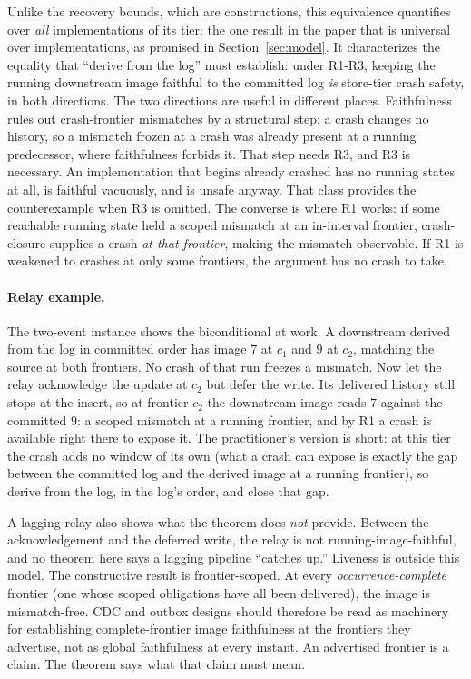 \documentclass[sigplan,10pt]{acmart}
\theoremstyle{plain}
\theoremstyle{definition}
\begin{document}
Unlike the recovery bounds, which are constructions, this equivalence
quantifies over \emph{all} implementations of its tier: the one
result in the paper that is universal over implementations, as promised in
Section~\ref{sec:model}. It characterizes the equality that ``derive
from the log'' must establish: under R1-R3, keeping the running
downstream image faithful to the committed log \emph{is} store-tier
crash safety, in both directions. The two directions are useful in
different places. Faithfulness rules out crash-frontier mismatches
by a structural step: a crash changes no history, so a mismatch frozen
at a crash was already present at a running predecessor, where
faithfulness forbids it. That step needs R3, and R3 is necessary. An
implementation that begins already crashed has no running states at
all, is faithful vacuously, and is unsafe anyway. That class provides
the counterexample when R3 is omitted. The converse is
where R1 works: if some reachable running state held a scoped mismatch
at an in-interval frontier, crash-closure supplies a crash \emph{at
that frontier}, making the mismatch observable. If R1 is weakened
to crashes at only some frontiers, the argument has no crash to take.

\paragraph{Relay example.}
The two-event instance shows the biconditional at work. A downstream
derived from the log in committed order has image $7$ at $c_1$ and $9$
at $c_2$, matching the source at both frontiers. No crash of that run
freezes a mismatch. Now let the relay acknowledge the update at $c_2$
but defer the write. Its delivered history still stops at the insert,
so at frontier $c_2$ the downstream image reads $7$ against the
committed $9$: a scoped mismatch at a running frontier, and by R1 a
crash is available right there to expose it. The practitioner's
version is short: at this tier the crash adds no window of its
own (what a crash can expose is exactly the gap between the
committed log and the derived image at a running frontier), so derive
from the log, in the log's order, and close that gap.

A lagging relay also shows what the theorem does \emph{not} provide.
Between the acknowledgement and the deferred write, the relay is not
running-image-faithful, and no theorem here says a lagging pipeline
``catches up.'' Liveness is outside this model. The constructive
result is frontier-scoped. At every
\emph{occurrence-complete} frontier (one whose scoped obligations
have all been delivered), the image is mismatch-free. CDC and outbox
designs should therefore be read as machinery for establishing
complete-frontier image faithfulness at the frontiers they advertise,
not as global faithfulness at every instant. An advertised frontier is
a claim. The theorem says what that claim must mean.
\end{document}
